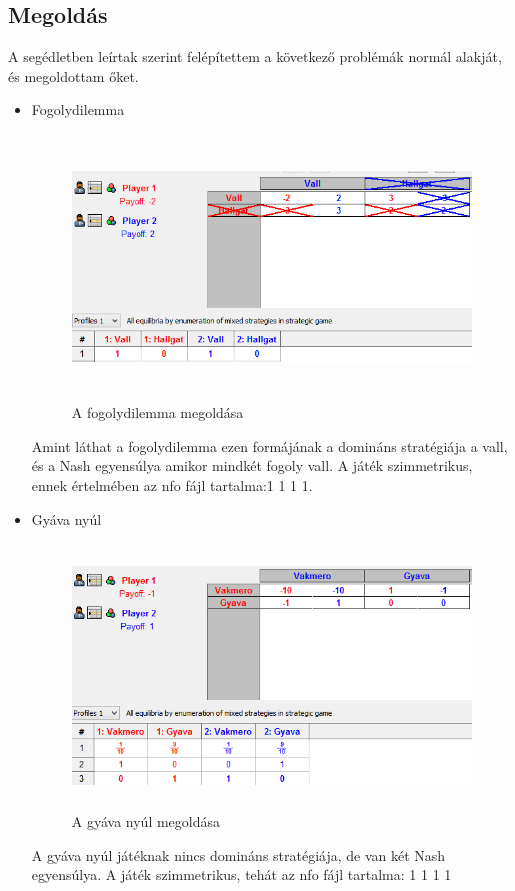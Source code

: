 \subsection{Megoldás}
A segédletben leírtak szerint felépítettem a következő problémák normál alakját, és megoldottam őket.
\begin{itemize}
\item Fogolydilemma
		\begin{figure}[h]
		\begin{center}
		\includegraphics[height=7cm]{figures/fogoly.png}
		\caption{A fogolydilemma megoldása}
		\end{center}
		\end{figure}
Amint láthat a fogolydilemma ezen formájának a domináns stratégiája a vall, és a Nash egyensúlya amikor mindkét fogoly vall. A játék szimmetrikus, ennek értelmében az nfo fájl tartalma:1	1	1 1.
		
\item Gyáva nyúl
		\begin{figure}[h]
		\begin{center}
		\includegraphics[height=7cm]{figures/nyul.png}
		\caption{A gyáva nyúl megoldása}
		\end{center}
		\end{figure}
A gyáva nyúl játéknak nincs domináns stratégiája, de van két Nash egyensúlya. A játék szimmetrikus, tehát az nfo fájl tartalma: 1	1	1 1
		

\end{itemize}
